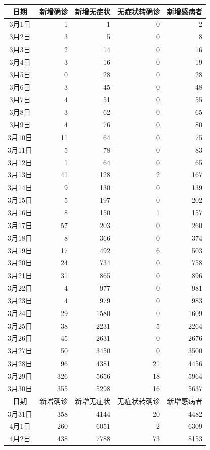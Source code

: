 \documentclass[12pt]{article}
\begin{document}
\begin{longtable}[c]{|c|r|r|r|r|}
\hline
日期 & 新增确诊 & 新增无症状 & 无症状转确诊 & 新增感病者 \\
\hline
3月1日 & 1 & 1 & 0 & 2 \\
3月2日 & 3 & 5 & 0 & 8 \\
3月3日 & 2 & 14 & 0 & 16 \\
3月4日 & 3 & 16 & 0 & 19 \\
3月5日 & 0 & 28 & 0 & 28 \\
3月6日 & 3 & 45 & 0 & 48 \\
3月7日 & 4 & 51 & 0 & 55 \\
3月8日 & 3 & 62 & 0 & 65 \\
3月9日 & 4 & 76 & 0 & 80 \\
3月10日 & 11 & 64 & 0 & 75 \\
3月11日 & 5 & 78 & 0 & 83 \\
3月12日 & 1 & 64 & 0 & 65 \\
3月13日 & 41 & 128 & 2 & 167 \\
3月14日 & 9 & 130 & 0 & 139 \\
3月15日 & 5 & 197 & 0 & 202 \\
3月16日 & 8 & 150 & 1 & 157 \\
3月17日 & 57 & 203 & 0 & 260 \\
3月18日 & 8 & 366 & 0 & 374 \\
3月19日 & 17 & 492 & 6 & 503 \\
3月20日 & 24 & 734 & 0 & 758 \\
3月21日 & 31 & 865 & 0 & 896 \\
3月22日 & 4 & 977 & 0 & 981 \\
3月23日 & 4 & 979 & 0 & 983 \\
3月24日 & 29 & 1580 & 0 & 1609 \\
3月25日 & 38 & 2231 & 5 & 2264 \\
3月26日 & 45 & 2631 & 0 & 2676 \\
3月27日 & 50 & 3450 & 0 & 3500 \\
3月28日 & 96 & 4381 & 21 & 4456 \\
3月29日 & 326 & 5656 & 18 & 5964 \\
3月30日 & 355 & 5298 & 16 & 5637 \\
\hline
日期 & 新增确诊 & 新增无症状 & 无症状转确诊 & 新增感病者 \\
\hline
3月31日 & 358 & 4144 & 20 & 4482 \\
4月1日 & 260 & 6051 & 2 & 6309 \\
4月2日 & 438 & 7788 & 73 & 8153 \\

\end{longtable}
\end{document}
